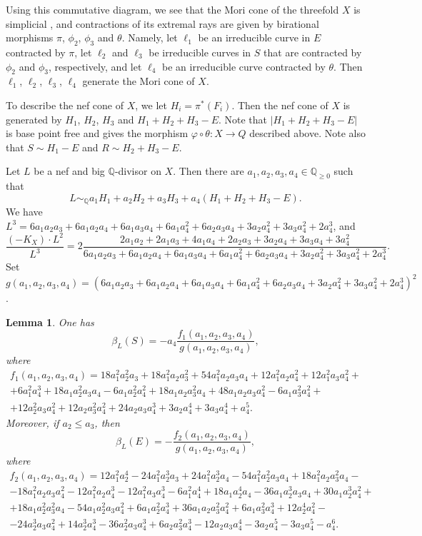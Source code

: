 \documentclass[12pt]{amsart}
\newtheorem{lemma}[theorem]{Lemma}
\theoremstyle{definition}
\theoremstyle{remark}
\begin{document}
Using this commutative diagram, we see that the Mori cone of the threefold $X$ is simplicial \cite{Matsuki}, and contractions of its extremal rays are given by birational morphisms $\pi$, $\phi_2$, $\phi_3$ and $\theta$. Namely, let $\ell_1$ be an irreducible curve in $E$ contracted by $\pi$, let $\ell_2$ and $\ell_3$ be irreducible curves in $S$ that are contracted by $\phi_2$ and $\phi_3$, respectively, and let $\ell_4$ be an irreducible curve contracted by $\theta$. Then $\ell_1$, $\ell_2$, $\ell_3$, $\ell_4$ generate the Mori cone of $X$.

To describe the nef cone of $X$, we let $H_i=\pi^*(F_i)$. Then the nef cone of $X$ is generated by $H_1$, $H_2$, $H_3$ and $H_1+H_2+H_3-E$. Note that $|H_1+H_2+H_3-E|$ is base point free and gives the morphism $\varphi\circ\theta\colon X\to Q$ described above. Note also that $S\sim H_1-E$ and $R\sim H_2+H_3-E$.

Let $L$ be a nef and big $\mathbb{Q}$-divisor on $X$. Then there are $a_1,a_2,a_3,a_4\in\mathbb{Q}_{\geqslant 0}$ such that
$$
L\sim_{\mathbb{Q}} a_1H_1+a_2H_2+a_3H_3+a_4(H_1+H_2+H_3-E).
$$
We have
$L^3=6a_1a_2a_3+6a_1a_2a_4+6a_1a_3a_4+6a_1a_4^2+6a_2a_3a_4+3a_2a_4^2+3a_3a_4^2+2a_4^3$,
and
$$
\frac{(-K_X)\cdot L^{2}}{L^3}=2\frac{2a_1a_2+2a_1a_3+4a_1a_4+2a_2a_3+3a_2a_4+3a_3a_4+3a_4^2}{6a_1a_2a_3+6a_1a_2a_4+6a_1a_3a_4+6a_1a_4^2+6a_2a_3a_4+3a_2a_4^2+3a_3a_4^2+2a_4^3}.
$$
Set $g(a_1,a_2,a_3,a_4)=(6a_1a_2a_3+6a_1a_2a_4+6a_1a_3a_4+6a_1a_4^2+6a_2a_3a_4+3a_2a_4^2+3a_3a_4^2+2a_4^3)^2$.

\begin{lemma}
\label{lemma:4-8}
One has
$$
\beta_{L}(S)=-a_4\frac{f_1(a_1,a_2,a_3,a_4)}{g(a_1,a_2,a_3,a_4)},
$$
where
\begin{multline*}
f_1(a_1,a_2,a_3,a_4)=18a_1^2a_2^2a_3+18a_1^2a_2a_3^2+54a_1^2a_2a_3a_4+12a_1^2a_2a_4^2+12a_1^2a_3a_4^2+\\
+6a_1^2a_4^3+18a_1a_2^2a_3a_4-6a_1a_2^2a_4^2+18a_1a_2a_3^2a_4+48a_1a_2a_3a_4^2-6a_1a_3^2a_4^2+\\
+12a_2^2a_3a_4^2+12a_2a_3^2a_4^2+24a_2a_3a_4^3+3a_2a_4^4+3a_3a_4^4+a_4^5.
\end{multline*}
Moreover, if $a_2\leqslant a_3$, then
$$
\beta_{L}(E)=-\frac{f_2(a_1,a_2,a_3,a_4)}{g(a_1,a_2,a_3,a_4)},
$$
where
\begin{multline*}
f_2(a_1,a_2,a_3,a_4)=12a_1^2a_2^4-24a_1^2a_2^3a_3+24a_1^2a_2^3a_4-54a_1^2a_2^2a_3a_4+18a_1^2a_2a_3^2a_4-\\
-18a_1^2a_2a_3a_4^2-12a_1^2a_2a_4^3-12a_1^2a_3a_4^3-6a_1^2a_4^4+18a_1a_2^4a_4-36a_1a_2^3a_3a_4+30a_1a_2^3a_4^2+\\
+18a_1a_2^2a_3^2a_4-54a_1a_2^2a_3a_4^2+6a_1a_2^2a_4^3+36a_1a_2a_3^2a_4^2+6a_1a_3^2a_4^3+12a_2^4a_4^2-\\
-24a_2^3a_3a_4^2+14a_2^3a_4^3-36a_2^2a_3a_4^3+6a_2a_3^2a_4^3-12a_2a_3a_4^4-3a_2a_4^5-3a_3a_4^5-a_4^6.
\end{multline*}
\end{lemma}
\end{document}

